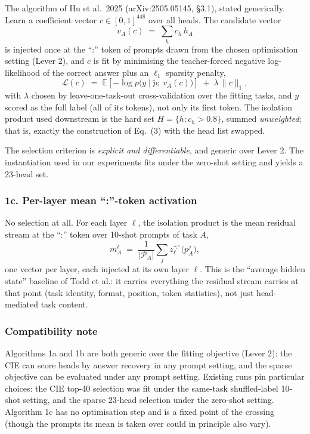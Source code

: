 \documentclass[
]{article}
\begin{document}
The algorithm of Hu et al.~2025 (arXiv:2505.05145, \S3.1), stated generically. Learn
a coefficient vector \(c \in [0,1]^{448}\) over all heads. The candidate vector
\[
v_A(c) \;=\; \sum_{h} c_h\, h_A \tag{4}
\]
is injected once at the ``:'' token of prompts drawn from the chosen optimisation
setting (Lever 2), and \(c\) is fit by minimising the teacher-forced negative
log-likelihood of the correct answer plus an \(\ell_1\) sparsity penalty,
\[
\mathcal{L}(c) \;=\;
\mathbb{E}\!\left[-\log p\big(y \mid \tilde p;\ v_A(c)\big)\right]
\;+\; \lambda \,\lVert c \rVert_1, \tag{5}
\]
with \(\lambda\) chosen by leave-one-task-out cross-validation over the fitting
tasks, and \(y\) scored as the full label (all of its tokens), not only its first
token. The isolation product used downstream is the hard set
\(H = \{h : c_h > 0.8\}\), summed \emph{unweighted}; that is, exactly the
construction of Eq.~(3) with the head list swapped.

The selection criterion is \emph{explicit and differentiable}, and generic over
Lever 2. The instantiation used in our experiments fits under the zero-shot setting
and yields a 23-head set.

\subsubsection{1c. Per-layer mean ``:''-token activation}\label{lever-1c}

No selection at all. For each layer \(\ell\), the isolation product is the mean
residual stream at the ``:'' token over 10-shot prompts of task \(A\),
\[
m^\ell_A \;=\; \frac{1}{|\mathcal{P}_A|} \sum_j z^{\text{``:''}}_\ell\!\big(p^j_A\big), \tag{6}
\]
one vector per layer, each injected at its own layer \(\ell\). This is the ``average
hidden state'' baseline of Todd et al.: it carries everything the residual stream
carries at that point (task identity, format, position, token statistics), not just
head-mediated task content.

\subsubsection{Compatibility note}\label{compatibility-note}

Algorithms 1a and 1b are both generic over the fitting objective (Lever 2): the CIE
can score heads by answer recovery in any prompt setting, and the sparse objective
can be evaluated under any prompt setting. Existing runs pin particular choices: the
CIE top-40 selection was fit under the same-task shuffled-label 10-shot setting, and
the sparse 23-head selection under the zero-shot setting. Algorithm 1c has no
optimisation step and is a fixed point of the crossing (though the prompts its mean
is taken over could in principle also vary).
\end{document}
